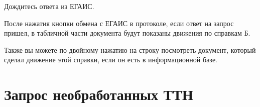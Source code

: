\documentclass[letterpaper,10pt,russian]{sphinxmanual}
\begin{document}
Дождитесь ответа из ЕГАИС.

После нажатия кнопки обмена с ЕГАИС в протоколе, если ответ на запрос пришел, в табличной части документа будут показаны движения по справкам Б.
\begin{figure}[htbp]
\centering

\noindent{}
\end{figure}

Также вы можете по двойному нажатию на строку посмотреть документ, который сделал движение этой справки, если он есть в информационной базе.


\section{Запрос необработанных ТТН}
\label{servicefunctions:id3}


\renewcommand{\indexname}{Алфавитный указатель}
\footnotesize\raggedright\printindex
\end{document}
